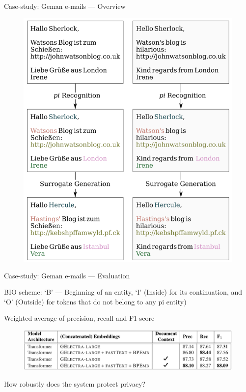 \documentclass[12pt,aspectratio=169,handout]{beamer}
\begin{document}
\begin{frame}{Case-study: Geman e-mails --- Overview}

\begin{figure}
\includegraphics[width=0.55\linewidth]{img/eder-et-al-1.png}
\end{figure}


\end{frame}


\begin{frame}{Case-study: Geman e-mails --- Evaluation}

BIO scheme: `B' --- Beginning of an entity, `I' (Inside) for its continuation, and ‘O’ (Outside) for tokens that do not belong to any pi entity)

Weighted average of precision, recall and F1 score

\begin{figure}
\includegraphics[width=\linewidth]{img/eder-et-al-3}
\end{figure}

How robustly does the system protect privacy?


\end{frame}
\end{document}
